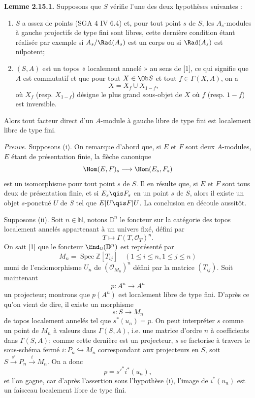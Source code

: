 \documentclass[11pt]{article}
\newcommand{\Spec}{\operatorname{Spec}}
\begin{document}
\textbf{Lemme 2.15.1.} Supposons que \(S\) vérifie l'une des deux hypothèses suivantes :
\begin{enumerate}[label=(\roman*)]
\item \(S\) a assez de points (SGA 4 IV 6.4) et, pour tout point \(s\) de \(S\), les \(A_s\)-modules à gauche projectifs de type fini sont libres, cette dernière condition étant réalisée par exemple si \(A_s/\Rad(A_s)\) est un corps ou si \(\Rad(A_s)\) est nilpotent;
\item \((S,A)\) est un topos « localement annelé » au sens de [1], ce qui signifie que \(A\) est commutatif et que pour tout \(X\in\Ob S\) et tout \(f\in\Gamma(X,A)\), on a
\[
  X=X_f\cup X_{1-f},
\]
où \(X_f\) (resp. \(X_{1-f}\)) désigne le plus grand sous-objet de \(X\) où \(f\) (resp. \(1-f\)) est inversible.
\end{enumerate}
Alors tout facteur direct d'un \(A\)-module à gauche libre de type fini est localement libre de type fini.

\emph{Preuve.} Supposons (i). On remarque d'abord que, si \(E\) et \(F\) sont deux \(A\)-modules, \(E\) étant de présentation finie, la flèche canonique
\[
  \Hom(E,F)_s\longrightarrow\Hom(E_s,F_s)
\]
est un isomorphisme pour tout point \(s\) de \(S\). Il en résulte que, si \(E\) et \(F\) sont tous deux de présentation finie, et si \(E_s\qis F_s\) en un point \(s\) de \(S\), alors il existe un objet \(s\)-ponctué \(U\) de \(S\) tel que \(E|U\qis F|U\). La conclusion en découle aussitôt.

Supposons (ii). Soit \(n\in\mathbb N\), notons \(\mathbb D^n\) le foncteur sur la catégorie des topos localement annelés appartenant à un univers fixé, défini par
\[
  T\longmapsto\Gamma(T,\mathcal O_T)^n.
\]
On sait [1] que le foncteur \(\End_{\mathbb D}(\mathbb D^n)\) est représenté par
\[
  M_n=\Spec\mathbb Z[T_{ij}]\quad(1\leq i\leq n,
  1\leq j\leq n)
\]
muni de l'endomorphisme \(U_n\) de \((\mathcal O_{M_n})^n\) défini par la matrice \((T_{ij})\). Soit maintenant
\[
  p:A^n\longrightarrow A^n
\]
un projecteur; montrons que \(p(A^n)\) est localement libre de type fini. D'après ce qu'on vient de dire, il existe un morphisme
\[
  s:S\longrightarrow M_n
\]
de topos localement annelés tel que \(s^*(u_n)=p\). On peut interpréter \(s\) comme un point de \(M_n\) à valeurs dans \(\Gamma(S,A)\), i.e. une matrice d'ordre \(n\) à coefficients dans \(\Gamma(S,A)\); comme cette dernière est un projecteur, \(s\) se factorise à travers le sous-schéma fermé \(i:P_n\hookrightarrow M_n\) correspondant aux projecteurs en \(S\), soit \(S\xrightarrow{s'}P_n\xrightarrow{i}M_n\). On a donc
\[
  p=s'^*i^*(u_n),
\]
et l'on gagne, car d'après l'assertion sous l'hypothèse (i), l'image de \(i^*(u_n)\) est un faisceau localement libre de type fini.
\end{document}
